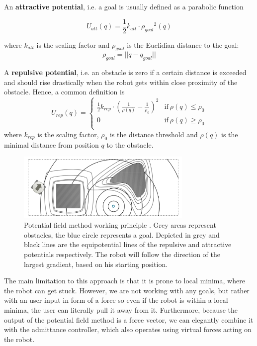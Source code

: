 An \textbf{attractive potential}, i.e. a goal is usually defined as a parabolic function

\begin{equation}
U_{att}(q) = \frac{1}{2} k_{att} \cdot {\rho_{goal}}^2(q)
\end{equation}

where $k_{att}$ is the scaling factor and $\rho_{goal}$ is the Euclidian distance to the goal:
\begin{equation}
\rho_{goal} = ||q-q_{goal}||
\end{equation}


A \textbf{repulsive potential}, i.e. an obstacle is zero if a certain distance is exceeded and should rise drastically when the robot gets within close proximity of the obstacle. Hence, a common definition is
\begin{equation}
U_{rep}(q) = \begin{cases}
      \frac{1}{2} k_{rep}\cdot (\frac{1}{\rho (q)}-\frac{1}{\rho_0})^2 & \text{if}\ \rho (q) \leq \rho_0 \\
      0 & \text{if}\ \rho (q) \geq \rho_0 \\
    \end{cases}
    \label{eq:pot_field_repulsive}
\end{equation}
where $k_{rep}$ is the scaling factor, $\rho_0$ is the distance threshold and $\rho (q)$ is the minimal distance from position $q$ to the obstacle.

\begin{figure}[h]
   \centering
   \includegraphics[width=0.75\textwidth]{images/pot_field.png}
   \caption{Potential field method working principle \citep{siegwart2004autonomous}. Grey areas represent obstacles, the blue circle represents a goal. Depicted in grey and black lines are the equipotential lines of the repulsive and attractive potentials respectively. The robot will follow the direction of the largest gradient, based on his starting position.} 
   \label{pics:pot_field}
\end{figure}

The main limitation to this approach is that it is prone to local minima, where the robot can get stuck. However, we are not working with any goals, but rather with an user input in form of a force so even if the robot is within a local minima, the user can literally pull it away from it. Furthermore, because the output of the potential field method is a force vector, we can elegantly combine it with the admittance controller, which also operates using virtual forces acting on the robot. 

